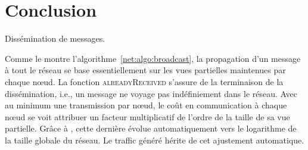 
\section{Conclusion}
\label{net:sec:conclusion}

\begin{algorithm}[h]
  
  \caption{\label{net:algo:broadcast} Dissémination de messages.}
\end{algorithm}

Comme le montre l'algorithme~\ref{net:algo:broadcast}, la propagation d'un
message à tout le réseau se base essentiellement sur les vues partielles
maintenues par chaque nœud. La fonction \textsc{alreadyReceived} s'assure de la
terminaison de la dissémination, i.e., un message ne voyage pas indéfiniement
dans le réseau. Avec au minimum une transmission par nœud, le coût en
communication à chaque nœud se voit attribuer un facteur multiplicatif de
l'ordre de la taille de sa vue partielle. Grâce à \SPRAY, cette dernière évolue
automatiquement vers le logarithme de la taille globale du réseau. Le traffic
généré hérite de cet ajustement automatique.

